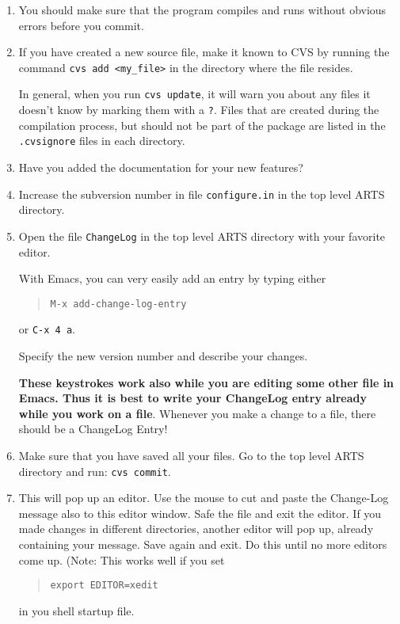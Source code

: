 \begin{enumerate}
\item You should make sure that the program compiles and runs without
  obvious errors before you commit.
\item If you have created a new source file, make it known to CVS by
  running the command \verb|cvs add <my_file>| in the directory where
  the file resides.
  
  In general, when you run \verb|cvs update|, it will warn you about
  any files it doesn't know by marking them with a \verb|?|. Files
  that are created during the compilation process, but should not be
  part of the package are listed in the \verb|.cvsignore| files in
  each directory.
\item Have you added the documentation for your new features?
\item Increase the subversion number in file \verb|configure.in| in
  the top level ARTS directory.
\item Open the file \verb|ChangeLog| in the top level ARTS directory
  with your favorite editor.
  
  With Emacs, you can very easily add an entry by typing either
  \begin{quote}
    \verb|M-x add-change-log-entry|
  \end{quote}
  or \verb|C-x 4 a|.
  
  Specify the new version number and describe your changes.

  \textbf{These keystrokes work also while you are editing some other
    file in Emacs. Thus it is best to write your ChangeLog entry
    already while you work on a file}. Whenever you make a change to a
  file, there should be a ChangeLog Entry!
\item Make sure that you have saved all your files. Go to the top
  level ARTS directory and run: \verb|cvs commit|.
\item This will pop up an editor. Use the mouse to cut and paste the
  Change-Log message also to this editor window. Safe the file and exit
  the editor. If you made changes in different directories, another
  editor will pop up, already containing your message. Save again and
  exit. Do this until no more editors come up. (Note: This works well
  if you set
  \begin{quote}
    \verb|export EDITOR=xedit|
  \end{quote}
  in you shell startup file.
 

\end{enumerate}
